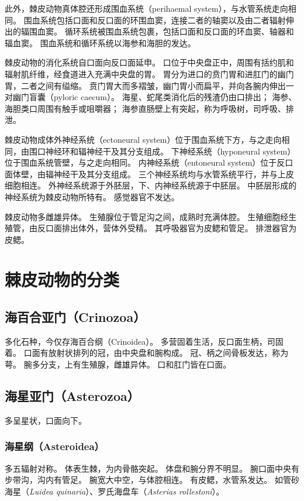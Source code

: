 \documentclass[11pt]{article}
\begin{document}
\newline

此外，棘皮动物真体腔还形成围血系统（perihaemal system），与水管系统走向相同。
围血系统包括口面和反口面的环围血窦，连接二者的轴窦以及由二者辐射伸出的辐围血窦。
循环系统被围血系统包裹，包括口面和反口面的环血窦、轴器和辐血窦。
围血系统和循环系统以海参和海胆的发达。

\newline

棘皮动物的消化系统自口面向反口面延申。
口位于中央盘正中，周围有括约肌和辐射肌纤维，经食道进入充满中央盘的胃。
胃分为进口的贲门胃和进肛门的幽门胃，二者之间有缢缩。
贲门胃大而多褶皱，幽门胃小而扁平，并向各腕内伸出一对幽门盲囊（pyloric caecum）。
海星、蛇尾类消化后的残渣仍由口排出；
海参、海胆类口周围有触手或咀嚼器；
海参直肠壁上有突起，称为呼吸树，司呼吸、排泄。

\newline

棘皮动物成体外神经系统（ectoneural system）位于围血系统下方，与之走向相同，由围口神经环和辐神经干及其分支组成。
下神经系统（hyponeural system）位于围血系统管壁，与之走向相同。
内神经系统（entoneural system）位于反口面体壁，由辐神经干及其分支组成。
三个神经系统均与水管系统平行，并与上皮细胞相连。
外神经系统源于外胚层，下、内神经系统源于中胚层。
中胚层形成的神经系统为棘皮动物所特有。
感觉器官不发达。

\newline

棘皮动物多雌雄异体。
生殖腺位于管足沟之间，成熟时充满体腔。
生殖细胞经生殖管，由反口面排出体外，营体外受精。
其呼吸器官为皮鳃和管足。
排泄器官为皮鳃。
  
\section{棘皮动物的分类}
\subsection{海百合亚门（Crinozoa）}
多化石种，今仅存海百合纲（Crinoidea）。
多营固着生活，反口面生柄，司固着。
口面有放射状排列的冠，由中央盘和腕构成。
冠、柄之间骨板发达，称为萼。
腕多分支，上有生殖腺，雌雄异体。
口和肛门皆在口面。
  
\subsection{海星亚门（Asterozoa）}
多呈星状，口面向下。

\subsubsection{海星纲（Asteroidea）}
多五辐射对称。
体表生棘，为内骨骼突起。
体盘和腕分界不明显。
腕口面中央有步带沟，沟内有管足。
腕宽大中空，与体腔相连。
有皮鳃，水管系发达。
如管砂海星（\textit{Luidea quinaria}）、罗氏海盘车（\textit{Asterias rollestoni}）。
\end{document}

